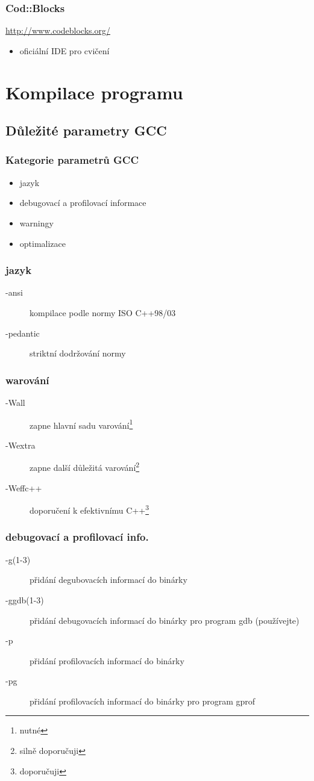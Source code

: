 \begin{frame}
	\frametitle{Cod::Blocks}
	\href{http://www.codeblocks.org/}{http://www.codeblocks.org/}
	\begin{itemize}
		\item{oficiální IDE pro cvičení}
	\end{itemize}
\end{frame}

\section{Kompilace programu}
\subsection{Důležité parametry GCC}

\begin{frame}
	\frametitle{Kategorie parametrů GCC}
	\begin{itemize}
		\item{jazyk}
		\item{debugovací a profilovací informace}
		\item{warningy}
		\item{optimalizace}
	\end{itemize}
\end{frame}

\begin{frame}
	\frametitle{jazyk}
	\begin{description}
		\item[-ansi]{kompilace podle normy ISO C++98/03}
		\item[-pedantic]{striktní dodržování normy}
	\end{description}
\end{frame}

\begin{frame}
	\frametitle{warování}
	\begin{description}
		\item[-Wall]{zapne hlavní sadu varování\footnote{\alert{nutné}}}
		\item[-Wextra]{zapne další důležitá varování\footnote{silně doporučuji}}
		\item[-Weffc++]{doporučení k efektivnímu C++\footnote{doporučuji}}
	\end{description}
\end{frame}

\begin{frame}
	\frametitle{debugovací a profilovací info.}
	\begin{description}
		\item[-g(1-3)]{přidání degubovacích informací do binárky}
		\item[-ggdb(1-3)]{přidání debugovacích informací do binárky pro program gdb (používejte)}
		\item[-p]{přidání profilovacích informací do binárky}
		\item[-pg]{přidání profilovacích informací do binárky pro program gprof}
	\end{description}
\end{frame}

